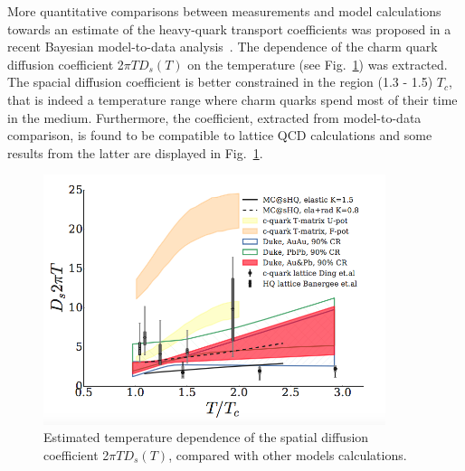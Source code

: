 More quantitative comparisons between measurements and model
calculations towards an estimate of the heavy-quark transport coefficients
was proposed in a recent Bayesian model-to-data analysis~\cite{Xu:2017hgt}. 
The dependence of the charm quark diffusion coefficient 2$\pi T D_s(T)$ on the temperature 
(see Fig.~\ref{fig:DiffCoeff}) was extracted.
The spacial diffusion coefficient is better constrained in the region (1.3 - 1.5) $T_c$, that is indeed a 
temperature range where charm quarks spend most of their time in the medium.
Furthermore, the coefficient, extracted from model-to-data comparison, 
is found to be compatible to lattice QCD calculations and some results 
from the latter are displayed in Fig.~\ref{fig:DiffCoeff}.

\begin{figure}[!ht]
  \centering
    \includegraphics[width=10cm]{FigCap2/DiffCoeff.png}
  \caption{Estimated temperature dependence of the spatial diffusion coefficient  2$\pi T D_s(T)$, compared with other models calculations.}
  \label{fig:DiffCoeff}
\end{figure}



